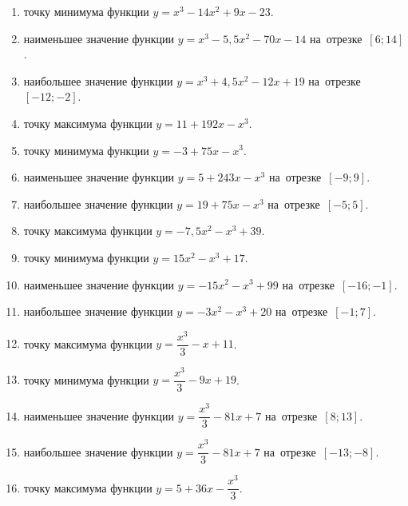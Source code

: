 \documentclass[a4paper,10pt]{article}
\begin{document}
\begin{enumerate}
\item {} точку минимума функции $y=x^3 -14x^2+9x-23$.

\item {} наименьшее значение функции $y=x^3 -5,5x^2-70x-14$ на~отрезке~$\left[6;14\right]$.

\item {} наибольшее значение функции $y=x^3 +4,5x^2-12x+19$ на~отрезке~$\left[-12;-2\right]$.

\item {} точку максимума функции $y=11+192x-x^3$.

\item {} точку минимума функции $y=-3+75x-x^3$.

\item {} наименьшее значение функции $y=5+243x-x^3$ на~отрезке~$\left[-9;9\right]$.

\item {} наибольшее значение функции $y=19+75x-x^3$ на~отрезке~$\left[-5;5\right]$.

\item {} точку максимума функции $y=-7,5x^2-x^3+39$.

\item {} точку минимума функции $y=15x^2-x^3+17$.

\item {} наименьшее значение функции $y=-15x^2-x^3+99$ на~отрезке~$\left[-16;-1\right]$.

\item {} наибольшее значение функции $y=-3x^2-x^3+20$ на~отрезке~$\left[-1;7\right]$.

\item {} точку максимума функции $y=\dfrac{x^3}{3} -x+11$.

\item {} точку минимума функции $y=\dfrac{x^3}{3} -9x+19$.

\item {} наименьшее значение функции $y=\dfrac{x^3}{3} -81x+7$ на~отрезке~$\left[8;13\right]$.

\item {} наибольшее значение функции $y=\dfrac{x^3}{3} -81x+7$ на~отрезке~$\left[-13;-8\right]$.

\item {} точку максимума функции $y=5 +36x-\dfrac{x^3}{3}$.


\end{enumerate}
\end{document}
